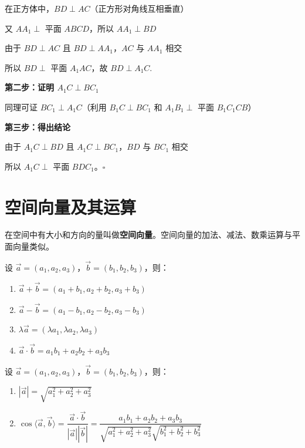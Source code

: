 在正方体中，$BD \perp AC$（正方形对角线互相垂直）

又 $AA_1 \perp$ 平面 $ABCD$，所以 $AA_1 \perp BD$

由于 $BD \perp AC$ 且 $BD \perp AA_1$，$AC$ 与 $AA_1$ 相交

所以 $BD \perp$ 平面 $A_1AC$，故 $BD \perp A_1C$.

\textbf{第二步：证明 $A_1C \perp BC_1$}

同理可证 $BC_1 \perp A_1C$（利用 $B_1C \perp BC_1$ 和 $A_1B_1 \perp$ 平面 $B_1C_1CB$）

\textbf{第三步：得出结论}

由于 $A_1C \perp BD$ 且 $A_1C \perp BC_1$，$BD$ 与 $BC_1$ 相交

所以 $A_1C \perp$ 平面 $BDC_1$。\hfill $\square$

\section{空间向量及其运算}

\begin{definition}[空间向量]
在空间中有大小和方向的量叫做\textbf{空间向量}。空间向量的加法、减法、数乘运算与平面向量类似。
\end{definition}

\begin{theorem}[空间向量的坐标运算]
设 $\vec{a} = (a_1, a_2, a_3)$，$\vec{b} = (b_1, b_2, b_3)$，则：
\begin{enumerate}
    \item $\vec{a} + \vec{b} = (a_1 + b_1, a_2 + b_2, a_3 + b_3)$
    \item $\vec{a} - \vec{b} = (a_1 - b_1, a_2 - b_2, a_3 - b_3)$
    \item $\lambda\vec{a} = (\lambda a_1, \lambda a_2, \lambda a_3)$
    \item $\vec{a} \cdot \vec{b} = a_1b_1 + a_2b_2 + a_3b_3$
\end{enumerate}
\end{theorem}

\begin{theorem}[空间向量的模与夹角]
设 $\vec{a} = (a_1, a_2, a_3)$，$\vec{b} = (b_1, b_2, b_3)$，则：
\begin{enumerate}
    \item $|\vec{a}| = \sqrt{a_1^2 + a_2^2 + a_3^2}$
    \item $\cos\langle\vec{a}, \vec{b}\rangle = \dfrac{\vec{a} \cdot \vec{b}}{|\vec{a}||\vec{b}|} = \dfrac{a_1b_1 + a_2b_2 + a_3b_3}{\sqrt{a_1^2 + a_2^2 + a_3^2}\sqrt{b_1^2 + b_2^2 + b_3^2}}$
\end{enumerate}
\end{theorem}

